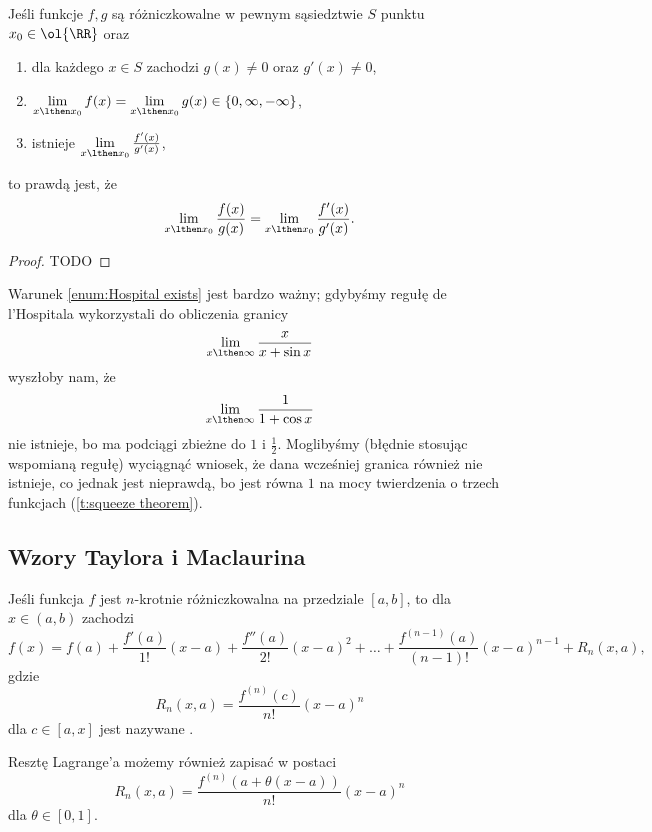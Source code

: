 \documentclass[11pt]{scrartcl}
\begin{document}
    \begin{theorem}
        \label{t:Hospital}
        Jeśli funkcje $f, g$ są różniczkowalne w pewnym sąsiedztwie $S$ punktu $x_0 \in \ol{\RR}$ oraz
        \begin{enumerate}
            \item dla każdego $x \in S$ zachodzi $g(x) \neq 0$ oraz $g'(x) \neq 0$,
            \item $\lim\limits_{x\lthen x_0} f(x) = \lim\limits_{x\lthen x_0} g(x) \in \{0, \infty, -\infty\}$,
            \item \label{enum:Hospital exists} istnieje $\lim\limits_{x\lthen x_0}\frac{f'(x)}{g'(x)}$,
        \end{enumerate}
        to prawdą jest, że
        \[ \lim_{x\lthen x_0}\frac{f(x)}{g(x)} = \lim_{x\lthen x_0}\frac{f'(x)}{g'(x)}. \]
    \end{theorem}
    \begin{proof}
        TODO
    \end{proof}
    \begin{remark}
        Warunek \ref{enum:Hospital exists} jest bardzo ważny; gdybyśmy regułę de l'Hospitala wykorzystali do obliczenia granicy
        \[ \lim_{x\lthen\infty}\frac{x}{x + \sin x} \]
        wyszłoby nam, że
        \[ \lim_{x\lthen\infty}\frac{1}{1 + \cos x} \]
        nie istnieje, bo ma podciągi zbieżne do $1$ i $\frac{1}{2}$. Moglibyśmy (błędnie stosując wspomianą regułę) wyciągnąć wniosek, że dana wcześniej granica również nie istnieje, co jednak jest nieprawdą, bo jest równa $1$ na mocy twierdzenia o trzech funkcjach (\ref{t:squeeze theorem}).
    \end{remark}

    \subsection{Wzory Taylora i Maclaurina}
    \begin{theorem}[Taylora]
        \label{t:Taylor}
        Jeśli funkcja $f$ jest $n$-krotnie różniczkowalna na przedziale $[a, b]$, to dla $x \in (a, b)$ zachodzi
        \[ f(x) = f(a) + \frac{f'(a)}{1!}(x - a) + \frac{f''(a)}{2!}(x - a)^2 + \ldots + \frac{f^{(n-1)}(a)}{(n-1)!}(x - a)^{n-1} + R_n(x, a), \]
        gdzie
        \[ R_n(x, a) = \frac{f^{(n)}(c)}{n!}(x - a)^n \]
        dla $c \in [a, x]$ jest nazywane .
    \end{theorem}

    Resztę Lagrange'a możemy również zapisać w postaci
    \[ R_n(x, a) = \frac{f^{(n)}(a + \theta(x - a))}{n!}(x - a)^n \]
    dla $\theta \in [0, 1]$.
\end{document}
